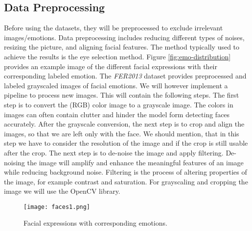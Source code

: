 \subsection{Data Preprocessing}
Before using the datasets, they will be preprocessed to exclude irrelevant images/emotions. Data preprocessing includes reducing different types of noises, resizing the picture, and aligning facial features. The method typically used to achieve the results is the eye selection method. Figure \ref{fig:emo-distribution} provides an example image of the different facial expressions with their corresponding labeled emotion. 
The \textit{FER2013} dataset provides preprocessed and labeled grayscaled images of facial emotions. We will however implement a pipeline to process new images. This will contain the following steps. The first step is to convert the (RGB) color image to a grayscale image. The colors in images can often contain clutter and hinder the model form detecting faces accurately. After the grayscale conversion, the next step is to crop and align the images, so that we are left only with the face. We should mention, that in this step we have to consider the resolution of the image and if the crop is still usable after the crop. The next step is to de-noise the image and apply filtering. De-noising the image will amplify and enhance the meaningful features of an image while reducing background noise.   Filtering is the process of altering properties of the image, for example contrast and saturation. For grayscaling and cropping the image we will use the OpenCV library.

\begin{figure}[h]
\centering
\texttt{[image: faces1.png]}\\
\caption{Facial expressions with corresponding emotions. \cite{FER2013}}\label{fig:faces}
\end{figure}
